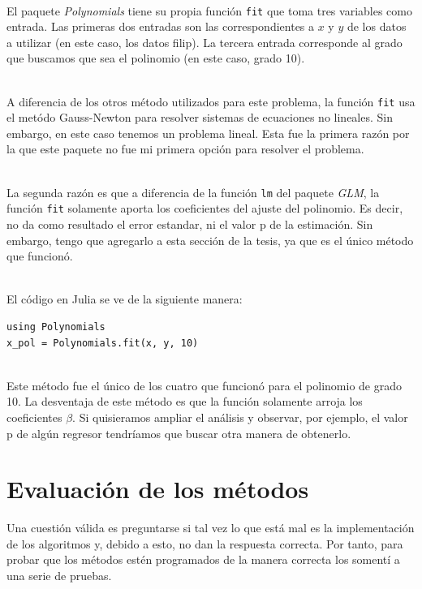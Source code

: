 \\

El paquete \textit{Polynomials} tiene su propia función \texttt{fit} que toma tres variables como entrada. Las primeras dos entradas son las correspondientes a $x$ y $y$ de los datos a utilizar (en este caso, los datos filip). La tercera entrada corresponde al grado que buscamos que sea el polinomio (en este caso, grado 10). 

\\

A diferencia de los otros método utilizados para este problema, la función \texttt{fit} usa el metódo Gauss-Newton para resolver sistemas de ecuaciones no lineales. Sin embargo, en este caso tenemos un problema lineal. Esta fue la primera razón por la que este paquete no fue mi primera opción para resolver el problema. 

\\

La segunda razón es que a diferencia de la función \texttt{lm} del paquete \textit{GLM}, la función \texttt{fit} solamente aporta los coeficientes del ajuste del polinomio. Es decir, no da como resultado el error estandar, ni el valor p de la estimación. Sin embargo, tengo que agregarlo a esta sección de la tesis, ya que es el único método que funcionó. 

\\

El código en Julia se ve de la siguiente manera:

\begin{verbatim}
using Polynomials 
x_pol = Polynomials.fit(x, y, 10)
\end{verbatim}

\\

Este método fue el único de los cuatro que funcionó para el polinomio de grado 10. La desventaja de este método es que la función solamente arroja los coeficientes $\beta$. Si quisieramos ampliar el análisis y observar, por ejemplo, el valor p de algún regresor tendríamos que buscar otra manera de obtenerlo. 


\section{Evaluación de los métodos}
Una cuestión válida es preguntarse si tal vez lo que está mal es la implementación de los algoritmos y, debido a esto, no dan la respuesta correcta. Por tanto, para probar que los métodos estén programados de la manera correcta los somentí a una serie de pruebas.

